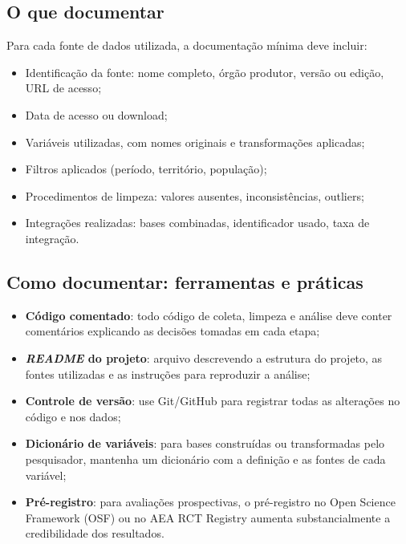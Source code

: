 \subsection{O que documentar}

Para cada fonte de dados utilizada, a documentação mínima deve incluir:

\begin{itemize}
  \item Identificação da fonte: nome completo, órgão produtor, versão ou edição, URL de acesso;
  \item Data de acesso ou download;
  \item Variáveis utilizadas, com nomes originais e transformações aplicadas;
  \item Filtros aplicados (período, território, população);
  \item Procedimentos de limpeza: valores ausentes, inconsistências, outliers;
  \item Integrações realizadas: bases combinadas, identificador usado, taxa de integração.
\end{itemize}

\subsection{Como documentar: ferramentas e práticas}

\begin{itemize}
  \item \textbf{Código comentado}: todo código de coleta, limpeza e análise deve conter comentários explicando as decisões tomadas em cada etapa;
  \item \textbf{\textit{README} do projeto}: arquivo descrevendo a estrutura do projeto, as fontes utilizadas e as instruções para reproduzir a análise;
  \item \textbf{Controle de versão}: use Git/GitHub para registrar todas as alterações no código e nos dados;
  \item \textbf{Dicionário de variáveis}: para bases construídas ou transformadas pelo pesquisador, mantenha um dicionário com a definição e as fontes de cada variável;
  \item \textbf{Pré-registro}: para avaliações prospectivas, o pré-registro no Open Science Framework (OSF) ou no AEA RCT Registry aumenta substancialmente a credibilidade dos resultados.
\end{itemize}

